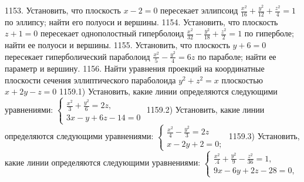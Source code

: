 1153. Установить, что плоскость $x-2=0$ пересекает эллипсоид $\frac{x^2}{16}+\frac{y^2}{12}+\frac{z^2}{4}=1$ по эллипсу; найти его полуоси и вершины.
1154. Установить, что плоскость $z+1=0$ пересекает однополостный гиперболоид $\frac{x^2}{32}-\frac{y^2}{18}+\frac{z^2}{2}=1$ по гиперболе; найти ее полуоси и вершины.
1155. Установить, что плоскость $y+6=0$ пересекает гиперболический параболоид $\frac{x^2}{5}-\frac{y^2}{4}=6 z$ по параболе; найти ее параметр и вершину.
1156. Найти уравнения проекций на координатные плоскости сечения эллиптического параболоида $y^2+z^2=x$ плоскостью $x+2 y-z=0$
1159.1) Установить, какие линии определяются следующими уравнениями: $\left\{\begin{array}{l}\frac{x^2}{3}+\frac{y^2}{6}=2 z, \\ 3 x-y+6 z-14=0\end{array}\right.$
1159.2) Установить, какие линии определяются следующими уравнениями: $\left\{\begin{array}{l}\frac{x^2}{4}-\frac{y^2}{3}=2 z \\ x-2 y+2=0 ;\end{array}\right.$
1159.3) Установить, какие линии определяются следующими уравнениями: $\left\{\begin{array}{l}\frac{x^2}{.4}+\frac{y^2}{9}-\frac{z^2}{36}=1, \\ 9 x-6 y+2 z-28=0,\end{array}\right.$